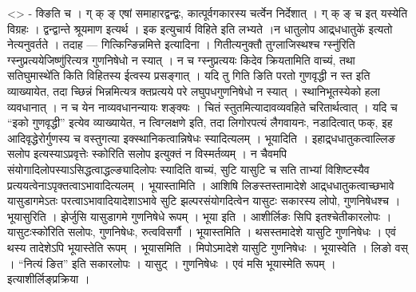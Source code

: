 \textless{}\textgreater{} - क्ङिति च । ग् क् ङ् एषां समाहारद्वन्द्वः,
कात्पूर्वगकारस्य चर्त्वेन निर्देशात् । ग् क् ङ् च इत् यस्येति विग्रहः ।
द्वन्द्वान्ते श्रूयमाण इत्यर्थ । इक इत्युचार्य विहिते इति लभ्यते ।न
धातुलोप आद्र्धधातुके॑ इत्यतो नेत्यनुवर्तते । तदाह ---
गित्किन्ङिन्नमित्ते इत्यादिना । गितीत्यनुक्तौ तुग्लाजिस्थश्च ग्स्नु॑रिति
ग्स्नुप्रत्ययेजिष्णु॑रित्यत्र गुणनिषेधो न स्यात् । न च ग्स्नुप्रत्ययः
किदेव क्रियतामिति वाच्यं, तथा सतिघुमास्थे॑ति किति विहितस्य ईत्वस्य
प्रसङ्गात् । यदि तु गिति ङिति परतो गुणवृद्धी न स्त इति व्याख्यायेत, तदा
च्छिन्नं भिन्नमित्यत्र क्तप्रत्यये परे लघुपधगुणनिषेधो न स्यात् ।
स्थानिभूतस्येको हला व्यवधानात् । न च येन नाव्यवधानन्यायः शङ्क्यः । चितं
स्तुतमित्यादावव्यवहिते चरितार्थत्वात् । यदि च ``इको गुणवृद्धी'' इत्येव
व्याख्यायेत, न त्विग्लक्षणे इति, तदा लिगोरपत्यं लैगवायनः, नडादित्वात्
फक्, इह आदिवृद्धेरोर्गुणस्य च वस्तुगत्या इक्स्थानिकत्वान्निषेधः
स्यादित्यलम् । भूयादिति । इहाद्र्धधातुकत्वाल्लिङ सलोप
इत्यस्याऽप्रवृत्तेः स्कोरिति सलोप इत्युक्तं न विस्मर्तव्यम् । न चैवमपि
संयोगादिलोपस्याऽसिद्धत्वाद्धल्ङ्यादिलोपः स्यादिति वाच्यं, सुटि यासुटि च
सति ताभ्यां विशिष्टस्यैव प्रत्ययत्वेनाऽपृक्तत्वाऽभावादित्यलम् ।
भूयास्तामिति । आशिषि लिङस्तस्तामादेशे आद्र्धधातुकत्वाच्छभावे
यासुडागमेऽतः परत्वाऽभावादियादेशाऽभावे सुटि झल्परसंयोगदित्वेन यासुटः
सकारस्य लोपो, गुणनिषेधश्च । भूयासुरिति । झेर्जुसि यासुडागमे गुणनिषेधे
रूपम् । भूया इति । आशीर्लिङः सिपि इतश्चेतीकारलोपः । यासुटःस्को॑रिति
सलोपः, गुणनिषेधः, रुत्वविसर्गौ । भूयास्तमिति । थसस्तमादेशे यासुटि
गुणनिषेधः । एवं थस्य तादेशेऽपि भूयास्तेति रूपम् । भूयासमिति ।
मिपोऽमादेशे यासुटि गुणनिषेधः । भूयास्वेति । लिङो वस् । ``नित्यं ङित''
इति सकारलोपः । यासुट् । गुणनिषेधः । एवं मसि भूयास्मेति रूपम् ।
इत्याशीर्लिङ्प्रक्रिया ।
